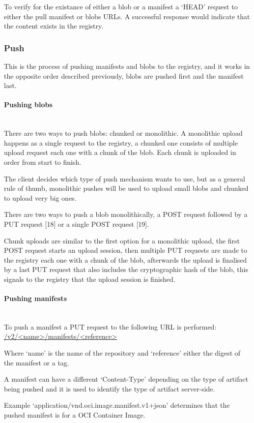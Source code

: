 \documentclass{article}
\newcommand{\subsubsubsection}[1]{\paragraph{#1}\mbox{}\\}
\begin{document}
  To verify for the existance of either a blob or a manifest a `HEAD' request to either the pull manifest or blobs URLs. A successful response would indicate that the content exists in the registry.

  \subsubsection{Push}

  This is the process of pushing manifests and blobs to the registry, and it works in the opposite order described previously, blobs are pushed first and the manifest last.

  \subsubsubsection{Pushing blobs}

  There are two ways to push blobs: chunked or monolithic. A monolithic upload happens as a single request to the registry, a chunked one consists of multiple upload request each one with a chunk of the blob. Each chunk is uploaded in order from start to finish.
  
  The client decides which type of push mechanism wants to use, but as a general rule of thumb, monolithic pushes will be used to upload small blobs and chunked to upload very big ones.

  There are two ways to push a blob monolithically, a POST request followed by a PUT request [18] or a single POST request [19].
  
  Chunk uploads are similar to the first option for a monolithic upload, the first POST request starts an upload session, then multiple PUT requests are made to the registry each one with a chunk of the blob, afterwards the upload is finalised by a last PUT request that also includes the cryptographic hash of the blob, this signals to the registry that the upload session is finished.
  
  \subsubsubsection{Pushing manifests}

  To push a manifest a PUT request to the following URL is performed: \url{/v2/<name>/manifests/<reference>}

  Where `name' is the name of the repository and `reference' either the digest of the manifest or a tag.

  A manifest can have a different `Content-Type' depending on the type of artifact being pushed and it is used to identify the type of artifact server-side.
  
  Example `application/vnd.oci.image.manifest.v1+json' determines that the pushed manifest is for a OCI Container Image.
\end{document}
